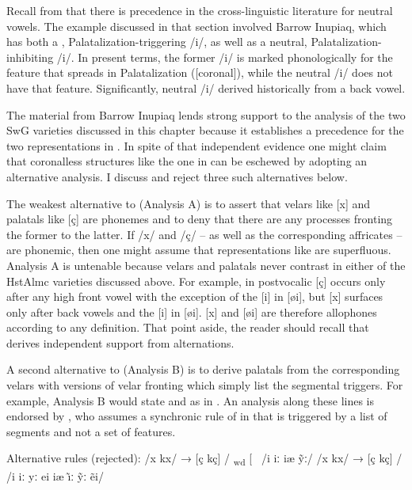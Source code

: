 Recall from  that there is precedence in the cross-linguistic literature for neutral vowels. The example discussed in that section \citep{Dresher2009} involved Barrow Inupiaq, which has both a , Palatalization-triggering /i/, as well as a neutral, Palatalization-inhibiting /i/. In present terms, the former /i/ is marked phonologically for the feature that spreads in Palatalization ([coronal]), while the neutral /i/ does not have that feature. Significantly, neutral /i/ derived historically from a back vowel.

The material from Barrow Inupiaq lends strong support to the analysis of the two SwG varieties discussed in this chapter because it establishes a precedence for the two representations in . In spite of that independent evidence one might claim that coronalless structures like the one in  can be eschewed by adopting an alternative analysis. I discuss and reject three such alternatives below.

The weakest alternative to  (Analysis A) is to assert that velars like [x] and palatals like [ç] are phonemes and to deny that there are any processes fronting the former to the latter. If /x/ and /ç/ -- as well as the corresponding affricates -- are phonemic, then one might assume that representations like  are superfluous. Analysis A is untenable because velars and palatals never contrast in either of the HstAlmc varieties discussed above. For example, in  postvocalic [ç] occurs only after any high front vowel with the exception of the [i] in [øi], but [x] surfaces only after back vowels and the [i] in [øi]. [x] and [øi] are therefore allophones according to any definition. That point aside, the reader should recall that  derives independent support from  alternations.

A second alternative to  (Analysis B) is to derive palatals from the corresponding velars with versions of velar fronting which simply list the segmental triggers. For example, Analysis B would state  and  as in . An analysis along these lines is endorsed by \citet[509--511]{Anderson1981}, who assumes a synchronic rule of  in  that is triggered by a list of segments and not a set of features.

\ea%
\label{ex:6:59}Alternative rules (rejected):
\ea\label{ex:6:59a}/x  kx/ →  [ç  kç] /     \textsubscript{wd} [ {\longrule}\     /i iː iæ ỹː/
\ex\label{ex:6:59b}/x  kx/ →  [ç  kç] /     /i iː yː ei iæ {\~\i}ː ỹː ẽi/  {\longrule}
\z
\z 

